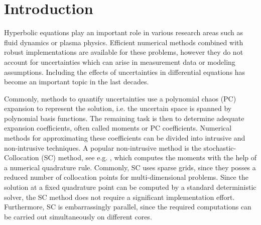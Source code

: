 \section{Introduction}
Hyperbolic equations play an important role in various research areas such as fluid dynamics or plasma physics. Efficient numerical methods combined with robust implementations are available for these problems, however they do not account for uncertainties which can arise in measurement data or modeling assumptions. Including the effects of uncertainties in differential equations has become an important topic in the last decades. %

Commonly, methods to quantify uncertainties use a polynomial chaos (PC) expansion \cite{wiener1938homogeneous,xiu2002wiener} to represent the solution, i.e. the uncertain space is spanned by polynomial basis functions. The remaining task is then to determine adequate expansion coefficients, often called moments or PC coefficients. Numerical methods for approximating these coefficients can be divided into intrusive and non-intrusive techniques. A popular non-intrusive method is the stochastic-Collocation (SC) method, see e.g. \cite{xiu2005high,babuvska2007stochastic,loeven2008probabilistic}, which computes the moments with the help of a numerical quadrature rule. Commonly, SC uses sparse grids, since they posses a reduced number of collocation points for multi-dimensional problems. Since the solution at a fixed quadrature point can be computed by a standard deterministic solver, the SC method does not require a significant implementation effort. Furthermore, SC is embarrassingly parallel, since the required computations can be carried out simultaneously on different cores. 

